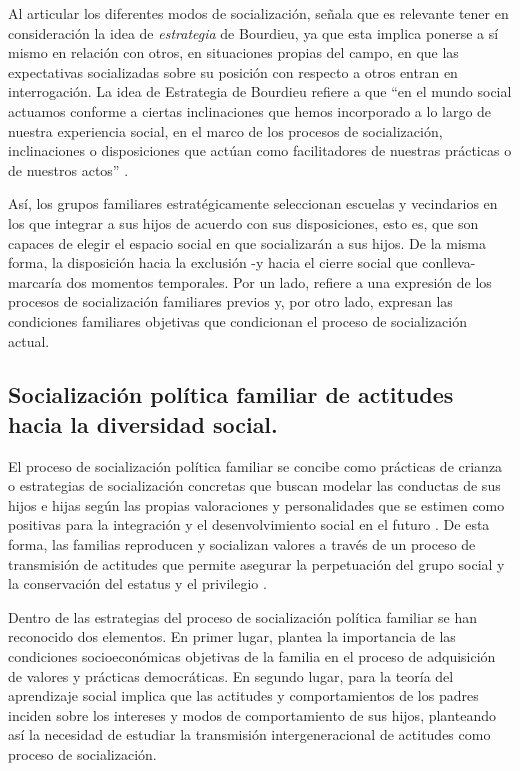 \documentclass[12pt,twoside]{templates/facsothesis}
\begin{document}
Al articular los diferentes modos de socialización, \citet{aedohenriquez_habitus_2015} señala que es relevante tener en consideración la idea de \emph{estrategia} de Bourdieu, ya que esta implica ponerse a sí mismo en relación con otros, en situaciones propias del campo, en que las expectativas socializadas sobre su posición con respecto a otros entran en interrogación. La idea de Estrategia de Bourdieu refiere a que ``en el mundo social actuamos conforme a ciertas inclinaciones que hemos incorporado a lo largo de nuestra experiencia social, en el marco de los procesos de socialización, inclinaciones o disposiciones que actúan como facilitadores de nuestras prácticas o de nuestros actos'' \citep[p.~280]{aguilar_habitus_2017}.

Así, los grupos familiares estratégicamente seleccionan escuelas y vecindarios en los que integrar a sus hijos de acuerdo con sus disposiciones, esto es, que son capaces de elegir el espacio social en que socializarán a sus hijos. De la misma forma, la disposición hacia la exclusión -y hacia el cierre social que conlleva- marcaría dos momentos temporales. Por un lado, refiere a una expresión de los procesos de socialización familiares previos y, por otro lado, expresan las condiciones familiares objetivas que condicionan el proceso de socialización actual.

\hypertarget{socializaciuxf3n-poluxedtica-familiar-de-actitudes-hacia-la-diversidad-social.}{%
\subsection{Socialización política familiar de actitudes hacia la diversidad social.}\label{socializaciuxf3n-poluxedtica-familiar-de-actitudes-hacia-la-diversidad-social.}}

El proceso de socialización política familiar se concibe como prácticas de crianza o estrategias de socialización concretas que buscan modelar las conductas de sus hijos e hijas según las propias valoraciones y personalidades que se estimen como positivas para la integración y el desenvolvimiento social en el futuro \citep{ramirez_padres_2005}. De esta forma, las familias reproducen y socializan valores a través de un proceso de transmisión de actitudes que permite asegurar la perpetuación del grupo social y la conservación del estatus y el privilegio \citep{bourdieu_reproduccion_1998, bernstein_theoretical_2005}.

Dentro de las estrategias del proceso de socialización política familiar se han reconocido dos elementos. En primer lugar, \citet{lipset_hombre_1997} plantea la importancia de las condiciones socioeconómicas objetivas de la familia en el proceso de adquisición de valores y prácticas democráticas. En segundo lugar, para \citet{bandura_sociallearning_1969} la teoría del aprendizaje social implica que las actitudes y comportamientos de los padres inciden sobre los intereses y modos de comportamiento de sus hijos, planteando así la necesidad de estudiar la transmisión intergeneracional de actitudes como proceso de socialización.
\end{document}
